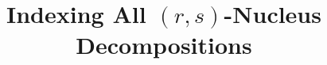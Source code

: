 \documentclass[sigconf, anonymous, nonacm]{acmart}
\begin{document}
\title{Indexing All $(r,s)$-Nucleus Decompositions}


\begin{abstract}

\end{abstract}

\maketitle
















\end{document}
